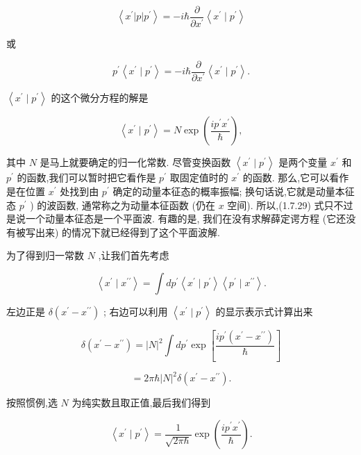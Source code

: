 \documentclass[lang=cn,newtx,10pt,scheme=chinese,thmcnt=section]{elegantbook}
\begin{document}
$$
\left\langle {{x}^{\prime }\left| p\right| {p}^{\prime }}\right\rangle = - i\hbar \frac{\partial }{\partial {x}^{\prime }}\left\langle {{x}^{\prime } \mid {p}^{\prime }}\right\rangle \tag{1.7.27}
$$

或

$$
{p}^{\prime }\left\langle {{x}^{\prime } \mid {p}^{\prime }}\right\rangle = - i\hbar \frac{\partial }{\partial {x}^{\prime }}\left\langle {{x}^{\prime } \mid {p}^{\prime }}\right\rangle . \tag{1. 7.28}
$$

$\left\langle {{x}^{\prime } \mid {p}^{\prime }}\right\rangle$ 的这个微分方程的解是

$$
\left\langle {{x}^{\prime } \mid {p}^{\prime }}\right\rangle = N\exp \left( \frac{i{p}^{\prime }{x}^{\prime }}{\hbar }\right) , \tag{1.7.29}
$$

其中 $N$ 是马上就要确定的归一化常数. 尽管变换函数 $\left\langle {{x}^{\prime } \mid {p}^{\prime }}\right\rangle$ 是两个变量 ${x}^{\prime }$ 和 ${p}^{\prime }$ 的函数,我们可以暂时把它看作是 ${p}^{\prime }$ 取固定值时的 ${x}^{\prime }$ 的函数. 那么,它可以看作是在位置 ${x}^{\prime }$ 处找到由 ${p}^{\prime }$ 确定的动量本征态的概率振幅; 换句话说,它就是动量本征态 ${p}^{\prime }$ ) 的波函数, 通常称之为动量本征函数 (仍在 $x$ 空间). 所以,(1.7.29) 式只不过是说一个动量本征态是一个平面波. 有趣的是, 我们在没有求解薛定谔方程 (它还没有被写出来) 的情况下就已经得到了这个平面波解.

为了得到归一常数 $N$ ,让我们首先考虑

$$
\left\langle {{x}^{\prime } \mid {x}^{\prime \prime }}\right\rangle = \int d{p}^{\prime }\left\langle {{x}^{\prime } \mid {p}^{\prime }}\right\rangle \left\langle {{p}^{\prime } \mid {x}^{\prime \prime }}\right\rangle . \tag{1. 7.30}
$$

左边正是 $\delta \left( {{x}^{\prime } - {x}^{\prime \prime }}\right)$ ; 右边可以利用 $\left\langle {{x}^{\prime } \mid {p}^{\prime }}\right\rangle$ 的显示表示式计算出来

$$
\delta \left( {{x}^{\prime } - {x}^{\prime \prime }}\right) = {\left| N\right| }^{2}\int d{p}^{\prime }\exp \left\lbrack \frac{i{p}^{\prime }\left( {{x}^{\prime } - {x}^{\prime \prime }}\right) }{\hbar }\right\rbrack \tag{1.7.31}
$$

$$
= {2\pi }\hbar {\left| N\right| }^{2}\delta \left( {{x}^{\prime } - {x}^{\prime \prime }}\right) .
$$

按照惯例,选 $N$ 为纯实数且取正值,最后我们得到

$$
\left\langle {{x}^{\prime } \mid {p}^{\prime }}\right\rangle = \frac{1}{\sqrt{{2\pi }\hbar }}\exp \left( \frac{i{p}^{\prime }{x}^{\prime }}{\hbar }\right) . \tag{1. 7.32}
$$
\end{document}
